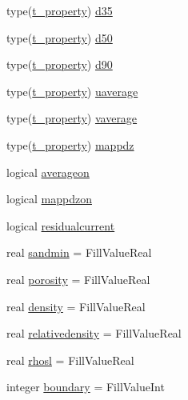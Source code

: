 \begin{DoxyCompactItemize}
\item 
type(\mbox{\hyperlink{structmodulesand_1_1t__property}{t\+\_\+property}}) \mbox{\hyperlink{structmodulesand_1_1t__sand_a21b2272f0359345bf8f29ca9ce68eed7}{d35}}
\item 
type(\mbox{\hyperlink{structmodulesand_1_1t__property}{t\+\_\+property}}) \mbox{\hyperlink{structmodulesand_1_1t__sand_a0dd49d06c89a3aac5a04545b38bd5ecb}{d50}}
\item 
type(\mbox{\hyperlink{structmodulesand_1_1t__property}{t\+\_\+property}}) \mbox{\hyperlink{structmodulesand_1_1t__sand_aeb62cd90972c17af5a823e5c468105f8}{d90}}
\item 
type(\mbox{\hyperlink{structmodulesand_1_1t__property}{t\+\_\+property}}) \mbox{\hyperlink{structmodulesand_1_1t__sand_a745b9b2874d2dd8b9a9a050ff9b1867f}{uaverage}}
\item 
type(\mbox{\hyperlink{structmodulesand_1_1t__property}{t\+\_\+property}}) \mbox{\hyperlink{structmodulesand_1_1t__sand_abff06df9edce3594ceaba0cd2fa697cc}{vaverage}}
\item 
type(\mbox{\hyperlink{structmodulesand_1_1t__property}{t\+\_\+property}}) \mbox{\hyperlink{structmodulesand_1_1t__sand_a75d2c9d1201ad81e41115c3e55be0d1c}{mappdz}}
\item 
logical \mbox{\hyperlink{structmodulesand_1_1t__sand_a84862fe75d89ca292c30eb8f9749e06f}{averageon}}
\item 
logical \mbox{\hyperlink{structmodulesand_1_1t__sand_a84916169b8727dabf27a5b619a65a99b}{mappdzon}}
\item 
logical \mbox{\hyperlink{structmodulesand_1_1t__sand_aa5ad6cc668a3db735028568d49e53d49}{residualcurrent}}
\item 
real \mbox{\hyperlink{structmodulesand_1_1t__sand_ad24d4b1810ef5185d2571d4a720aeb84}{sandmin}} = Fill\+Value\+Real
\item 
real \mbox{\hyperlink{structmodulesand_1_1t__sand_a0e7aa380a7433197b7aada79b91851c4}{porosity}} = Fill\+Value\+Real
\item 
real \mbox{\hyperlink{structmodulesand_1_1t__sand_aaebae40aebd1110ab1d86c3f496ecd35}{density}} = Fill\+Value\+Real
\item 
real \mbox{\hyperlink{structmodulesand_1_1t__sand_a02043f4f2e5c6332515b3211d380e507}{relativedensity}} = Fill\+Value\+Real
\item 
real \mbox{\hyperlink{structmodulesand_1_1t__sand_a20076e4e8a88f26c4bf63bb5234304eb}{rhosl}} = Fill\+Value\+Real
\item 
integer \mbox{\hyperlink{structmodulesand_1_1t__sand_a094ddfceec218969d50df14f341bcd1d}{boundary}} = Fill\+Value\+Int

\end{DoxyCompactItemize}
